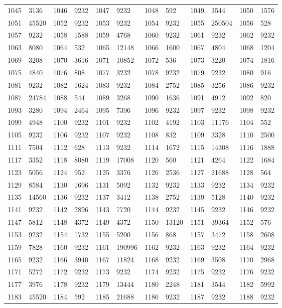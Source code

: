 \begin{longtable}{llllllllllll}
1045 & 3136&1046 &9232&1047& 9232&1048 &592&1049 &3544&1050& 1576\\
1051 & 45520&1052 &9232&1053& 9232&1054 &9232&1055 &250504&1056& 528\\
1057 & 9232&1058 &1588&1059& 4768&1060 &9232&1061 &9232&1062& 9232\\
1063 & 8080&1064 &532&1065& 12148&1066 &1600&1067 &4804&1068& 1204\\
1069 & 3208&1070 &3616&1071& 10852&1072 &536&1073 &3220&1074& 1816\\
1075 & 4840&1076 &808&1077& 3232&1078 &9232&1079 &9232&1080& 916\\
1081 & 9232&1082 &1624&1083& 9232&1084 &2752&1085 &3256&1086& 9232\\
1087 & 24784&1088 &544&1089& 3268&1090 &1636&1091 &4912&1092& 820\\
1093 & 3280&1094 &2464&1095& 7396&1096 &9232&1097 &9232&1098& 9232\\
1099 & 4948&1100 &9232&1101& 9232&1102 &4192&1103 &11176&1104& 552\\
1105 & 9232&1106 &9232&1107& 9232&1108 &832&1109 &3328&1110& 2500\\
1111 & 7504&1112 &628&1113& 9232&1114 &1672&1115 &14308&1116& 1888\\
1117 & 3352&1118 &8080&1119& 17008&1120 &560&1121 &4264&1122& 1684\\
1123 & 5056&1124 &952&1125& 3376&1126 &2536&1127 &21688&1128& 564\\
1129 & 8584&1130 &1696&1131& 5092&1132 &9232&1133 &9232&1134& 9232\\
1135 & 14560&1136 &9232&1137& 3412&1138 &2752&1139 &5128&1140& 9232\\
1141 & 9232&1142 &2896&1143& 7720&1144 &9232&1145 &9232&1146& 9232\\
1147 & 5812&1148 &4372&1149& 4372&1150 &13120&1151 &39364&1152& 576\\
1153 & 9232&1154 &1732&1155& 5200&1156 &868&1157 &3472&1158& 2608\\
1159 & 7828&1160 &9232&1161& 190996&1162 &9232&1163 &9232&1164& 9232\\
1165 & 9232&1166 &3940&1167& 11824&1168 &9232&1169 &3508&1170& 2968\\
1171 & 5272&1172 &9232&1173& 9232&1174 &9232&1175 &9232&1176& 9232\\
1177 & 3976&1178 &9232&1179& 13444&1180 &2248&1181 &3544&1182& 5992\\
1183 & 45520&1184 &592&1185& 21688&1186 &9232&1187 &9232&1188& 9232\\

\end{longtable}
